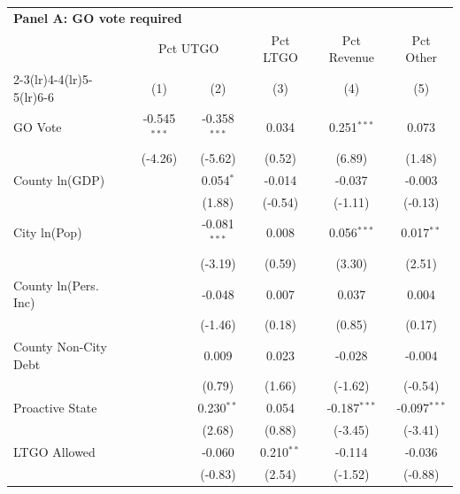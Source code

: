 \begingroup
\centering
\begin{tabular*}{\textwidth}{@{\extracolsep{\fill}}lccccc}
\multicolumn{5}{l}{\textbf{Panel A: GO vote required}}\\

\addlinespace
   \toprule
    & \multicolumn{2}{c}{Pct UTGO} & Pct LTGO & Pct Revenue & Pct Other\\
   \cmidrule(lr){2-3}\cmidrule(lr){4-4}\cmidrule(lr){5-5}\cmidrule(lr){6-6}
                        & (1)            & (2)            & (3)          & (4)            & (5)\\  
   \midrule 
   GO Vote              & -0.545$^{***}$ & -0.358$^{***}$ & 0.034        & 0.251$^{***}$  & 0.073\\   
                        & (-4.26)       & (-5.62)       & (0.52)      & (6.89)        & (1.48)\\   
   County ln(GDP)       &                & 0.054$^{*}$    & -0.014       & -0.037         & -0.003\\   
                        &                & (1.88)        & (-0.54)     & (-1.11)       & (-0.13)\\   
   City ln(Pop)         &                & -0.081$^{***}$ & 0.008        & 0.056$^{***}$  & 0.017$^{**}$\\   
                        &                & (-3.19)       & (0.59)      & (3.30)        & (2.51)\\   
   County ln(Pers. Inc) &                & -0.048         & 0.007        & 0.037          & 0.004\\   
                        &                & (-1.46)       & (0.18)      & (0.85)        & (0.17)\\   
   County Non-City Debt &                & 0.009          & 0.023        & -0.028         & -0.004\\   
                        &                & (0.79)        & (1.66)      & (-1.62)       & (-0.54)\\   
   Proactive State      &                & 0.230$^{**}$   & 0.054        & -0.187$^{***}$ & -0.097$^{***}$\\   
                        &                & (2.68)        & (0.88)      & (-3.45)       & (-3.41)\\   
   LTGO Allowed         &                & -0.060         & 0.210$^{**}$ & -0.114         & -0.036\\   
                        &                & (-0.83)       & (2.54)      & (-1.52)       & (-0.88)\\   

\end{tabular*}
